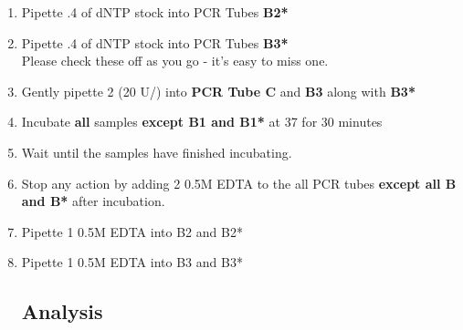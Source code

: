 \documentclass{ssiBio}
\begin{document}
\begin{enumerate}
\item{Pipette .4\uL{} of dNTP stock into PCR Tubes \textbf{B2*}}
\item{Pipette .4\uL{} of dNTP stock into PCR Tubes \textbf{B3*}}\\
	Please check these off as you go - it's easy to miss one.
\item{Gently pipette 2\uL{} \tdt{} (20 U/\uL{}) into \textbf{PCR Tube C} and \textbf{B3} along with \textbf{B3*}}
\item{Incubate \textbf{all} samples \textbf{except B1 and B1*} at 37\C{} for 30 minutes}
\item{Wait until the samples have finished incubating.}
\item{Stop any \tdt action by adding 2\uL{} 0.5M EDTA to the all PCR tubes \textbf{except all B and B*} after incubation.\cite{Invitrogen2002}}
\item{Pipette 1\uL{} 0.5M EDTA into B2 and B2*}
\item{Pipette 1\uL{} 0.5M EDTA into B3 and B3*}

\RstopPoint{} 
\subsection{Analysis}

\end{enumerate}
\end{document}
